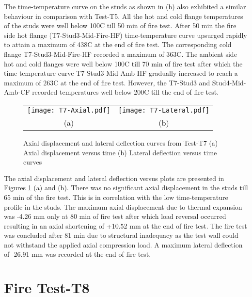 The time-temperature curve on the studs as shown in  (b) also exhibited a similar behaviour in comparison with Test-T5. All the hot and cold flange temperatures of the studs were well below 100\degree C till 50 min of fire test. After 50 min the fire side hot flange (T7-Stud3-Mid-Fire-HF) time-temperature curve upsurged rapidly to attain a maximum of 438\degree C at the end of fire test. The corresponding cold flange T7-Stud3-Mid-Fire-HF recorded a maximum of 363\degree C. The ambient side hot and cold flanges were well below 100\degree C till 70 min of fire test after which the time-temperature curve T7-Stud3-Mid-Amb-HF gradually increased to reach a maximum of 263\degree C at the end of fire test. However, the T7-Stud3 and Stud4-Mid-Amb-CF recorded temperatures well below 200\degree C till the end of fire test.  
\begin{figure}[!htbp]
	\centering	
		\begin{tabular}{cc}
			\texttt{[image: T7-Axial.pdf]} & \texttt{[image: T7-Lateral.pdf]} \\
			(a) & (b) \\
			\end{tabular}
		\caption{Axial displacement and lateral deflection curves from Test-T7 (a) Axial displacement versus time (b) Lateral deflection versus time curves}
		\label{fig:T7-displacement}
\end{figure}

The axial displacement and lateral deflection versus plots are presented in Figures \ref{fig:T7-displacement} (a) and (b). There was no significant axial displacement in the studs till 65 min of the fire test. This is in correlation with the low time-temperature profile in the studs. The maximum axial displacement due to thermal expansion was -4.26 mm only at 80 min of fire test after which load reversal occurred resulting in an axial shortening of +10.52 mm at the end of fire test. The fire test was concluded after 81 min due to structural inadequacy as the test wall could not withstand the applied axial compression load. A maximum lateral deflection of -26.91 mm was recorded at the end of fire test.  

\section{Fire Test-T8}

